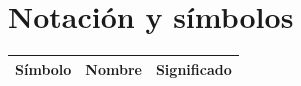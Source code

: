 \chapter{Notación y símbolos}

\begin{longtable}{p{}p{}p{}}
\toprule
\textbf{Símbolo} & \textbf{Nombre} & \textbf{Significado}\\
\midrule
\endhead
\bottomrule
\end{longtable}
